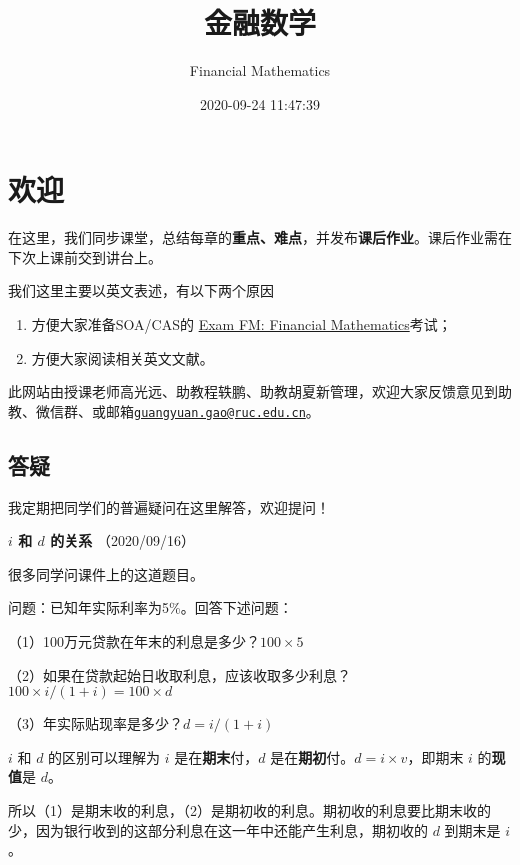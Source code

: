 \documentclass[
]{book}
\title{金融数学}
\author{Financial Mathematics}
\date{2020-09-24 11:47:39}
\begin{document}
\maketitle

{
\setcounter{tocdepth}{1}
\tableofcontents
}
\hypertarget{ux6b22ux8fce}{%
\chapter*{欢迎}\label{ux6b22ux8fce}}

在这里，我们同步课堂，总结每章的\textbf{重点、难点}，并发布\textbf{课后作业}。课后作业需在下次上课前交到讲台上。

我们这里主要以英文表述，有以下两个原因

\begin{enumerate}
\def\labelenumi{\arabic{enumi}.}
\item
  方便大家准备SOA/CAS的 \href{https://www.soa.org/education/exam-req/edu-exam-fm-detail/}{Exam FM: Financial Mathematics}考试；
\item
  方便大家阅读相关英文文献。
\end{enumerate}

此网站由授课老师高光远、助教程轶鹏、助教胡夏新管理，欢迎大家反馈意见到助教、微信群、或邮箱\href{mailto:guangyuan.gao@ruc.edu.cn}{\nolinkurl{guangyuan.gao@ruc.edu.cn}}。

\hypertarget{ux7b54ux7591}{%
\section*{答疑}\label{ux7b54ux7591}}

我定期把同学们的普遍疑问在这里解答，欢迎提问！

\textbf{\(i\) 和 \(d\) 的关系} （2020/09/16）

很多同学问课件上的这道题目。

问题：已知年实际利率为5\%。回答下述问题：

（1）100万元贷款在年末的利息是多少？\(100\times5%
\)

（2）如果在贷款起始日收取利息，应该收取多少利息？\(100\times i/(1+i)=100\times d\)

（3）年实际贴现率是多少？\(d=i/(1+i)\)

\(i\) 和 \(d\) 的区别可以理解为 \(i\) 是在\textbf{期末}付，\(d\) 是在\textbf{期初}付。\(d=i\times v\)，即期末 \(i\) 的\textbf{现值}是 \(d\)。

所以（1）是期末收的利息，（2）是期初收的利息。期初收的利息要比期末收的少，因为银行收到的这部分利息在这一年中还能产生利息，期初收的 \(d\) 到期末是 \(i\)。
\end{document}
